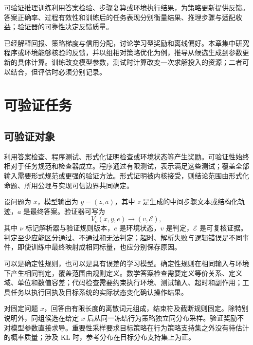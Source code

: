 \documentclass[../textbook.tex]{subfiles}
\begin{document}
\fi
{}

可验证推理训练利用答案检验、步骤复算或环境执行结果，为策略更新提供反馈。答案正确率、过程有效性和训练后的任务表现分别衡量结果、推理步骤与适配收益；验证器的可靠性决定反馈质量。

已经解释回报、策略梯度与信用分配，讨论学习型奖励和离线偏好。本章集中研究程序或环境能够核验的反馈，并以组相对策略优化为例，推导从候选生成到参数更新的具体计算。训练改变模型参数，测试时计算改变一次求解投入的资源；二者可以结合，但评估时必须分别记录。

\section{可验证任务}

\subsection{可验证对象}
利用答案检查、程序测试、形式化证明检查或环境状态等产生奖励。可验证性始终相对于任务规范和检查器成立。程序通过有限测试，表示满足这些测试；覆盖全部输入需要形式规范或更强的验证方法。形式证明被内核接受，则结论范围由形式化命题、所用公理与实现可信边界共同确定。

设问题为 $x$，模型输出为 $y=(z,a)$，其中 $z$ 是生成的中间步骤文本或结构化轨迹，$a$ 是最终答案。验证器可写为
\begin{equation}
 V_\nu(x,y,e)\longrightarrow(v,\mathcal E),
\end{equation}
其中 $\nu$ 标记解析器与验证规则版本，$e$ 是环境状态，$v$ 是判定，$\mathcal E$ 是可复核证据。判定至少应能区分通过、不通过和无法判定；超时、解析失败与逻辑错误是不同事件，即使训练中最终映射成相同标量，也应分别保存原因。

可以是确定性规则，也可以是具有误差的学习模型。确定性规则在相同输入与环境下产生相同判定，覆盖范围由规则定义。数学答案检查需要定义等价关系、定义域、单位和数值容差；代码检查需要约束执行环境、测试输入、超时和副作用；工具任务以执行回执及目标系统的实际状态变化确认操作结果。

\begin{assumption}[本章策略推导]
对固定问题 $x$，回答由有限长度的离散词元组成，结束符及截断规则固定。除特别说明外，同组候选在给定 $x$ 后从同一冻结行为策略独立同分布采样。验证奖励不对模型参数直接求导。重要性采样要求目标策略在行为策略支持集之外没有待估计的概率质量；涉及 KL 时，参考分布在目标分布支持集上为正。
\end{assumption}
\end{document}
